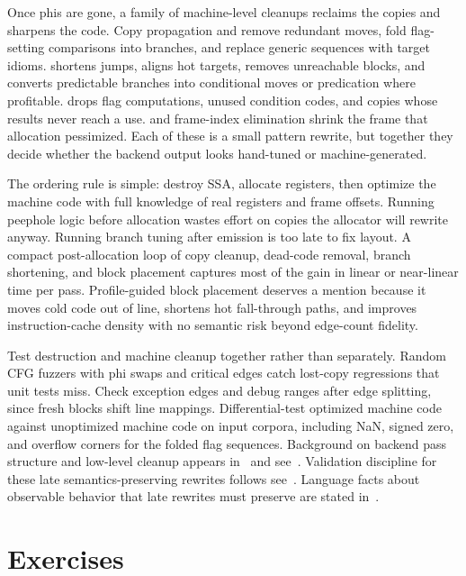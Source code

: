 Once phis are gone, a family of machine-level cleanups reclaims the copies and sharpens the code.
Copy propagation and  remove redundant moves, fold flag-setting comparisons into branches, and replace generic sequences with target idioms.
 shortens jumps, aligns hot targets, removes unreachable blocks, and converts predictable branches into conditional moves or predication where profitable.
 drops flag computations, unused condition codes, and copies whose results never reach a use.
 and frame-index elimination shrink the frame that allocation pessimized.
Each of these is a small pattern rewrite, but together they decide whether the backend output looks hand-tuned or machine-generated.

The ordering rule is simple: destroy SSA, allocate registers, then optimize the machine code with full knowledge of real registers and frame offsets.
Running peephole logic before allocation wastes effort on copies the allocator will rewrite anyway.
Running branch tuning after emission is too late to fix layout.
A compact post-allocation loop of copy cleanup, dead-code removal, branch shortening, and block placement captures most of the gain in linear or near-linear time per pass.
Profile-guided block placement deserves a mention because it moves cold code out of line, shortens hot fall-through paths, and improves instruction-cache density with no semantic risk beyond edge-count fidelity.

Test destruction and machine cleanup together rather than separately.
Random CFG fuzzers with phi swaps and critical edges catch lost-copy regressions that unit tests miss.
Check exception edges and debug ranges after edge splitting, since fresh blocks shift line mappings.
Differential-test optimized machine code against unoptimized machine code on input corpora, including NaN, signed zero, and overflow corners for the folded flag sequences.
Background on backend pass structure and low-level cleanup appears in~\cite{morgan-1998-optimizing} and see~\cite{appel-1998-modern}.
Validation discipline for these late semantics-preserving rewrites follows see~\cite{safonov-2010-trustworthy}.
Language facts about observable behavior that late rewrites must preserve are stated in~\cite{wg14-2011-c11}.

\section{Exercises}\label{sec:ch28-exercises}

